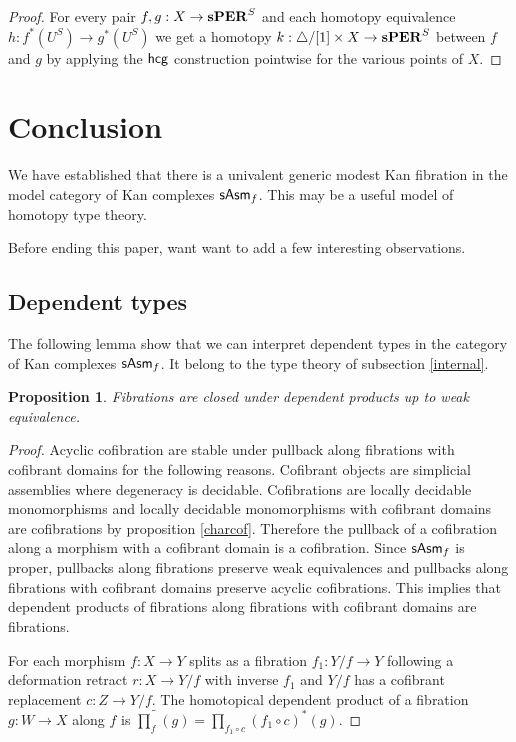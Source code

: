 \documentclass{amsart}
\theoremstyle{plain}
\newtheorem{prop}[theorem]{Proposition}
\theoremstyle{definition}
\newcommand\ri{^*}
\begin{document}
\begin{proof} For every pair $f,g:X\to \mathbf{s}\mathbf{PER}^S$ and each homotopy equivalence $h:f\ri(U^S) \to g\ri(U^S)$ we get a homotopy $k:{\mathord{\triangle}}/[1]\times X \to \mathbf{s} \mathbf{PER}^S$ between $f$ and $g$ by applying the $\mathsf{hcg}$ construction pointwise for the various points of $X$. 
\end{proof}


\section{Conclusion}
We have established that there is a univalent generic modest Kan fibration in the model category of Kan complexes $\mathsf{sAsm}_f$. This may be a useful model of homotopy type theory.

Before ending this paper, want want to add a few interesting observations.

\subsection{Dependent types}  The following lemma show that we can interpret dependent types in the category of Kan complexes $\mathsf{sAsm}_f$. It belong to the type theory of subsection \ref{internal}.

\begin{prop} Fibrations are closed under dependent products up to weak equivalence. \end{prop}

\begin{proof} Acyclic cofibration are stable under pullback along fibrations with cofibrant domains for the following reasons. Cofibrant objects are simplicial assemblies where degeneracy is decidable. Cofibrations are locally decidable monomorphisms and locally decidable monomorphisms with cofibrant domains are cofibrations by proposition \ref{charcof}. Therefore the pullback of a cofibration along a morphism with a cofibrant domain is a cofibration. Since $\mathsf{sAsm}_f$ is proper, pullbacks along fibrations preserve weak equivalences and pullbacks along fibrations with cofibrant domains preserve acyclic cofibrations. This implies that dependent products of fibrations along fibrations with cofibrant domains are fibrations.

For each morphism $f:X\to Y$ splits as a fibration $f_1:Y/f\to Y$ following a deformation retract $r:X\to Y/f$ with inverse $f_1$ and $Y/f$ has a cofibrant replacement $c:Z\to Y/f$. The homotopical dependent product of a fibration $g:W\to X$ along $f$ is $\widetilde{\prod_f}(g) = \prod_{f_1\circ c}(f_1\circ c)\ri(g)$.
\end{proof}
\end{document}
